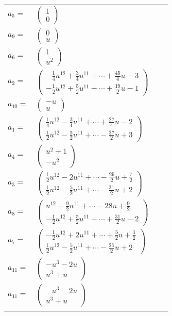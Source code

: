 \documentclass[1p]{elsarticle_modified}
\theoremstyle{definition}
\begin{document}
\begin{tabular}{m{7pt} m{180pt} m{7pt} m{180pt} }
\flushright $a_{5}=$&$\begin{pmatrix}1\\0\end{pmatrix}$ \\
\flushright $a_{9}=$&$\begin{pmatrix}0\\u\end{pmatrix}$ \\
\flushright $a_{6}=$&$\begin{pmatrix}1\\u^2\end{pmatrix}$ \\
\flushright $a_{2}=$&$\begin{pmatrix}-\frac{1}{4} u^{12}+\frac{3}{4} u^{11}+\cdots+\frac{45}{4} u-3\\-\frac{1}{2} u^{12}+\frac{5}{2} u^{11}+\cdots+\frac{19}{2} u-1\end{pmatrix}$ \\
\flushright $a_{10}=$&$\begin{pmatrix}- u\\u\end{pmatrix}$ \\
\flushright $a_{1}=$&$\begin{pmatrix}\frac{1}{4} u^{12}-\frac{3}{4} u^{11}+\cdots+\frac{27}{4} u-2\\\frac{1}{2} u^{12}-\frac{5}{2} u^{11}+\cdots-\frac{37}{2} u+3\end{pmatrix}$ \\
\flushright $a_{4}=$&$\begin{pmatrix}u^2+1\\- u^2\end{pmatrix}$ \\
\flushright $a_{3}=$&$\begin{pmatrix}\frac{1}{2} u^{12}-2 u^{11}+\cdots-\frac{29}{2} u+\frac{7}{2}\\\frac{1}{2} u^{12}-\frac{5}{2} u^{11}+\cdots-\frac{31}{2} u+2\end{pmatrix}$ \\
\flushright $a_{8}=$&$\begin{pmatrix}u^{12}-\frac{9}{2} u^{11}+\cdots-28 u+\frac{9}{2}\\-\frac{1}{2} u^{12}+\frac{5}{2} u^{11}+\cdots+\frac{31}{2} u-2\end{pmatrix}$ \\
\flushright $a_{7}=$&$\begin{pmatrix}-\frac{1}{2} u^{12}+2 u^{11}+\cdots+\frac{5}{2} u+\frac{1}{2}\\\frac{1}{2} u^{12}-\frac{5}{2} u^{11}+\cdots-\frac{25}{2} u+2\end{pmatrix}$ \\
\flushright $a_{11}=$&$\begin{pmatrix}- u^3-2 u\\u^3+u\end{pmatrix}$\\ \flushright $a_{11}=$&$\begin{pmatrix}- u^3-2 u\\u^3+u\end{pmatrix}$\\&\end{tabular}
\end{document}
